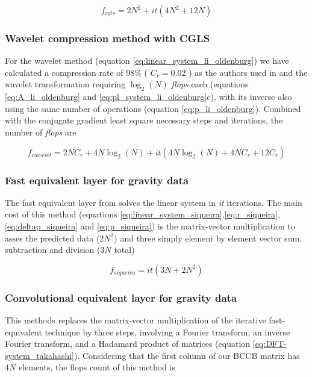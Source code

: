 \begin{equation}
	f_{cgls} = 2N^2 + it(4N^2 + 12N)
\label{cgls}
\end{equation}

\subsubsection{Wavelet compression method with CGLS \citep{li-oldenburg2010}}

For the wavelet method (equation \ref{eq:linear_system_li_oldenburg}) we have calculated a compression rate of $98\%$ ( $C_r = 0.02$ ) as the authors used in \cite{li-oldenburg2010} and the wavelet transformation requiring $\log_2(N)$ \textit{flops} each (equations \ref{eq:A_li_oldenburg} and \ref{eq:pl_system_li_oldenburg}c), with its inverse also using the same number of operations (equation \ref{eq:p_li_oldenburg}). Combined with the conjugate gradient least square necessary steps and iterations, the number of \textit{flops} are

\begin{equation}
	f_{wavelet} = 2NC_r + 4N\log_2(N) + it(4N\log_2(N) + 4NC_r + 12C_r)
\label{wavelet}
\end{equation}

\subsubsection{Fast equivalent layer for gravity data \citep{siqueira-etal2017}}

The fast equivalent layer from \cite{siqueira-etal2017} solves the linear system in \textit{it} iterations. The main cost of this method (equations \ref{eq:linear_system_siqueira},\ref{eq:r_siqueira}, \ref{eq:deltap_siqueira} and \ref{eq:p_siqueira}) is the matrix-vector multiplication to asses the predicted data ($2N^2$) and three simply element by element vector sum, subtraction and division ($3N$ total)

\begin{equation}
	f_{siqueira} = it(3N +2N^2)
	\label{siqueira}
\end{equation}

\subsubsection{Convolutional equivalent layer for gravity data \citep{takahashi2020}}

This methods replaces the matrix-vector multiplication of the iterative fast-equivalent technique \citep{siqueira-etal2017} by three steps, involving a Fourier transform, an inverse Fourier transform, and a Hadamard product of matrices (equation \ref{eq:DFT-system_takahashi}). Considering that the first column of our BCCB matrix has $4N$ elements, the flops count of this method is

